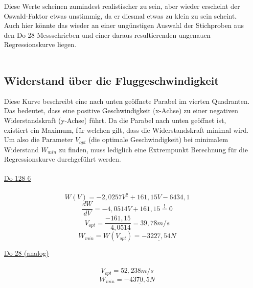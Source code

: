 \vspace{3mm} \noindent
Diese Werte scheinen zumindest realistischer zu sein, aber wieder erscheint der Oswald-Faktor etwas unstimmig, da er diesmal etwas zu klein zu sein scheint. Auch hier könnte das wieder an einer ungünstigen Auswahl der Stichproben aus den Do 28 Messschrieben und einer daraus resultierenden ungenauen Regressionskurve liegen. \\\\

\subsection{Widerstand über die Fluggeschwindigkeit}
Diese Kurve beschreibt eine nach unten geöffnete Parabel im vierten Quadranten. Das bedeutet, dass eine positive Geschwindigkeit (x-Achse) zu einer negativen Widerstandskraft (y-Achse) führt. Da die Parabel nach unten geöffnet ist, existiert ein Maximum, für welchen gilt, dass die Widerstandskraft minimal wird. Um also die Parameter $V_{opt}$ (die optimale Geschwindigkeit) bei minimalem Widerstand $W_{min}$ zu finden, muss lediglich eine Extrempunkt Berechnung für die Regressionskurve durchgeführt werden.\\\\
\underline{Do 128-6}\\\\
\begin{equation*}
W(V)=-2,0257V^2+161,15V-6434,1
\end{equation*}
\begin{equation*}
\frac{dW}{dV}=-4,0514V+161,15\overset{!}{=}0
\end{equation*}
\begin{equation*}
V_{opt}=\frac{-161,15}{-4,0514}=\underline{39,78 m/s}
\end{equation*}
\begin{equation*}
W_{min}=W(V_{opt}) = \underline{-3227,54 N}
\end{equation*}

\vspace{3mm} \noindent
\underline{Do 28 (analog)}\\\\
\begin{equation*}
V_{opt}=\underline{52,238 m/s}
\end{equation*}
\begin{equation*}
W_{min}= \underline{-4370,5 N}
\end{equation*}

